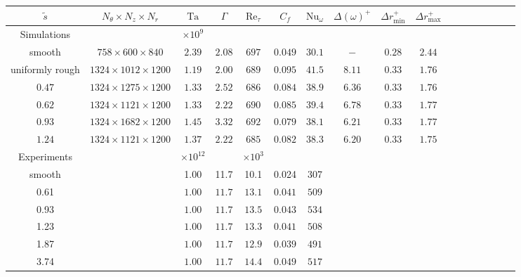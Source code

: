 \ifdefined\thesissections
\begin{landscape}
\fi
\begin{table}
\centering
\hspace*{-0.0cm}\begin{tabular}{ccccc|ccc|ccccccccc}
$\tilde s$ & $N_\theta\times N_z \times N_r$ &$\text{Ta}$ & $\Gamma$  & $\text{Re}_\tau$ & $C_f$ & $\text{Nu}_\omega$ & $\Delta (\omega)^+$ &  $\Delta r^+_\text{min}$ & $\Delta r^+_\text{max}$\\
\hline
Simulations &  & $\times 10^9$ \\ 
\hline
smooth 	 & $758\times600\times840$  & $2.39$  & $2.08$& $697$  & $0.049$  &$30.1$  & $-$  & $0.28$  & $2.44$ & \\

uniformly rough& $1324\times 1012\times 1200$ & $1.19$ & $2.00$ & $689$ &$0.095$  & $41.5$ & $8.11$  & $0.33$  & $1.76$ \\
$0.47$   & $1324\times 1275\times 1200$ & $1.33$ & $2.52$ & $686$ &$0.084$  & $38.9$ & $6.36$  & $0.33$  & $1.76$ \\
$0.62$   & $1324\times 1121\times 1200$ & $1.33$ & $2.22$ & $690$ &$0.085$  & $39.4$ & $6.78$  & $0.33$  & $1.77$ \\
$0.93$   & $1324\times 1682\times 1200$ & $1.45$ & $3.32$ & $692$ &$0.079$  & $38.1$ & $6.21$  & $0.33$  & $1.77$ \\
$1.24$   & $1324\times 1121\times 1200$ & $1.37$ & $2.22$ & $685$ &$0.082$  & $38.3$ & $6.20$  & $0.33$  & $1.75$ \\

\hline
Experiments &  & $\times 10^{12}$ & & $\times 10^3$\\ 
\hline
smooth & & 1.00 & 11.7 & 10.1 & 0.024 & 307 & & & \\
0.61 & &$1.00$ & $11.7$   & $13.1$  & $0.041$ & $509$ & &  &\\
0.93 & &$1.00$ & $11.7$   & $13.5$  & $0.043$ & $534$ & &  &\\
1.23 & &$1.00$ & $11.7$   & $13.3$  & $0.041$ & $508$ & &  &\\
1.87 & &$1.00$ & $11.7$   & $12.9$  & $0.039$ & $491$ & &  &\\
3.74 & &$1.00$ & $11.7$   & $14.4$  & $0.049$ & $517$ & &  &\\
\hline


\end{tabular}
\end{table}
\end{landscape}
